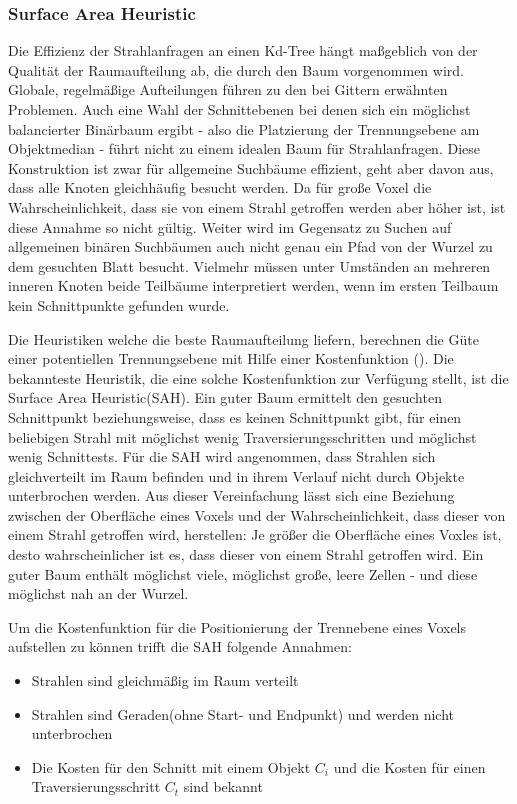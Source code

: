 \subsubsection{Surface Area Heuristic}

Die Effizienz der Strahlanfragen an einen Kd-Tree hängt maßgeblich von der Qualität der Raumaufteilung ab, die durch den Baum vorgenommen wird. Globale, regelmäßige Aufteilungen führen zu den bei Gittern erwähnten Problemen. Auch eine Wahl der Schnittebenen bei denen sich ein möglichst balancierter Binärbaum ergibt - also die Platzierung der Trennungsebene am Objektmedian - führt nicht zu einem idealen Baum für Strahlanfragen. Diese Konstruktion ist zwar für allgemeine Suchbäume effizient, geht aber davon aus, dass alle Knoten gleichhäufig besucht werden. Da für große Voxel die Wahrscheinlichkeit, dass sie von einem Strahl getroffen werden aber höher ist, ist diese Annahme so nicht gültig. Weiter wird im Gegensatz zu Suchen auf allgemeinen binären Suchbäumen auch nicht genau ein Pfad von der Wurzel zu dem gesuchten Blatt besucht. Vielmehr müssen unter Umständen an mehreren inneren Knoten beide Teilbäume interpretiert werden, wenn im ersten Teilbaum kein Schnittpunkte gefunden wurde.\citep{Wald04}

Die Heuristiken welche die beste Raumaufteilung liefern, berechnen die Güte einer potentiellen Trennungsebene mit Hilfe einer Kostenfunktion (\cite{Havran00}). Die bekannteste Heuristik, die eine solche Kostenfunktion zur Verfügung stellt, ist die Surface Area Heuristic(SAH). Ein guter Baum ermittelt den gesuchten Schnittpunkt beziehungsweise, dass es keinen Schnittpunkt gibt, für einen beliebigen Strahl mit möglichst wenig Traversierungsschritten und möglichst wenig Schnittests. Für die SAH wird angenommen, dass Strahlen sich gleichverteilt im Raum befinden und in ihrem Verlauf nicht durch Objekte unterbrochen werden. Aus dieser Vereinfachung lässt sich eine Beziehung zwischen der Oberfläche eines Voxels und der Wahrscheinlichkeit, dass dieser von einem Strahl getroffen wird, herstellen: Je größer die Oberfläche eines Voxles ist, desto wahrscheinlicher ist es, dass dieser von einem Strahl getroffen wird. Ein guter Baum enthält möglichst viele, möglichst große, leere Zellen - und diese möglichst nah an der Wurzel. 

Um die Kostenfunktion für die Positionierung der Trennebene eines Voxels aufstellen zu können trifft die SAH folgende Annahmen:
\begin{itemize}
 \item Strahlen sind gleichmäßig im Raum verteilt
 \item Strahlen sind Geraden(ohne Start- und Endpunkt) und werden nicht unterbrochen
 \item Die Kosten für den Schnitt mit einem Objekt $C_i$ und die Kosten für einen Traversierungsschritt $C_t$ sind bekannt
\end{itemize}

